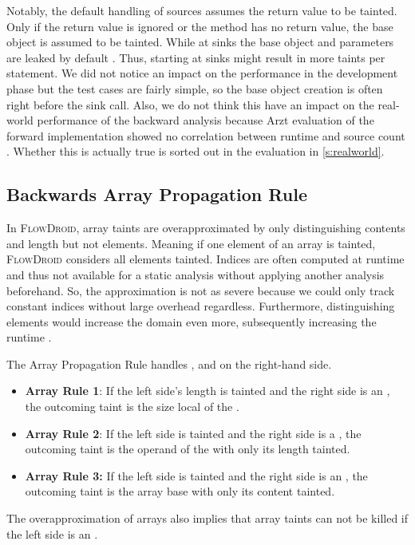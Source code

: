 \documentclass[../draft.tex]{subfiles}
\begin{document}
    Notably, the default handling of sources assumes the return value to be tainted. 
    Only if the return value is ignored or the method has no return value, the base object is assumed to be tainted.
    While at sinks the base object and parameters are leaked by default \cite{Arzt2017PhD}.
    Thus, starting at sinks might result in more taints per statement.
    We did not notice an impact on the performance in the development phase but the test cases are fairly simple, so the base object creation is often right before the sink call.
    Also, we do not think this have an impact on the real-world performance of the backward analysis because Arzt evaluation of the forward implementation showed no correlation between runtime and source count \cite{Arzt2017PhD}.
    Whether this is actually true is sorted out in the evaluation in \autoref{s:realworld}.

    \subsection{Backwards Array Propagation Rule}
    In \textsc{FlowDroid}, array taints are overapproximated by only distinguishing contents and length but not elements. Meaning if one element of an array is tainted, \textsc{FlowDroid} considers all elements tainted. 
    Indices are often computed at runtime and thus not available for a static analysis without applying another analysis beforehand. So, the approximation is not as severe because we could only track constant indices without large overhead regardless. 
    Furthermore, distinguishing elements would increase the domain even more, subsequently increasing the runtime \cite{Arzt2017PhD}.

    The Array Propagation Rule handles ,  and  on the right-hand side.
    \begin{itemize}
        \item \textbf{Array Rule 1}: If the left side's length is tainted and the right side is an , the outcoming taint is the size local of the .
        \item  \textbf{Array Rule 2}: If the left side is tainted and the right side is a , the outcoming taint is the operand of the  with only its length tainted.
        \item \textbf{Array Rule 3:} If the left side is tainted and the right side is an , the outcoming taint is the array base with only its content tainted.
    \end{itemize}
    The overapproximation of arrays also implies that array taints can not be killed if the left side is an .
\end{document}
